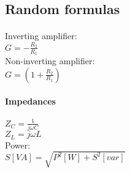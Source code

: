 \documentclass{article}
\begin{document}
\subsection{Random formulas}
\paragraph{}
Inverting amplifier:\\
$G = -\frac{R_2}{R_1}$\\
Non-inverting amplifier:\\
$G = (1+\frac{R_2}{R_1})$
\paragraph{Impedances}
$Z_C = \frac{1}{j \omega C}$\\
$Z_L = j \omega L$\\
Power: \\
$S [VA] = \sqrt{P^2[W] + S^2[var]}$
\end{document}
